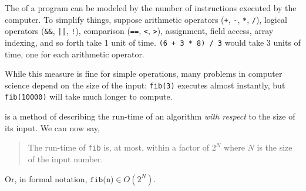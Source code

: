 \begin{blocksection}
The  of a program can be modeled by the number of
instructions executed by the computer. To simplify things, suppose arithmetic
operators (\lstinline$+$, \lstinline$-$, \lstinline$*$, \lstinline$/$), logical
operators (\lstinline$&&$, \lstinline$||$, \lstinline$!$), comparison
(\lstinline$==$, \lstinline$<$, \lstinline$>$), assignment, field access, array
indexing, and so forth take 1 unit of time. \lstinline$(6 + 3 * 8) / 3$ would
take 3 units of time, one for each arithmetic operator.

While this measure is fine for simple operations, many problems in computer
science depend on the size of the input: \lstinline$fib(3)$ executes almost
instantly, but \lstinline$fib(10000)$ will take much longer to compute.

 is a method of describing the run-time of an
algorithm \emph{with respect} to the size of its input. We can now say,

\begin{quote}
The run-time of \lstinline$fib$ is, at most, within a factor of $2^N$ where $N$
is the size of the input number.
\end{quote}

Or, in formal notation, $\texttt{fib(n)} \in O(2^N)$.
\end{blocksection}
